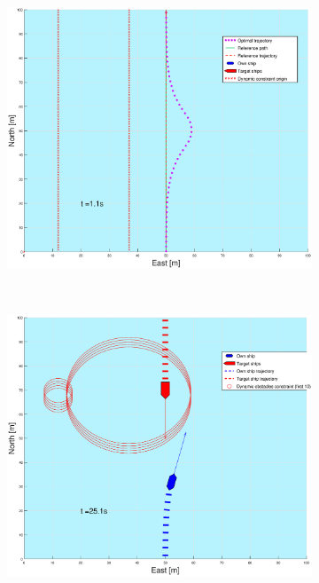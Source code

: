 \begin{figure}[!b]
    \hfill
    \begin{subfigure}[b]{0.499\textwidth}
        \centering
        \includegraphics[width=\textwidth]{Images/Figures/enkel_HO/_Simple_0fig999_time=1}
    \end{subfigure}
    \hfill
    \\
    \begin{subfigure}[b]{0.49\textwidth}
        \centering
        \includegraphics[width=\textwidth]{Images/Figures/enkel_HO/_Simple_0fig1_time=25}

\end{subfigure}
\end{figure}
